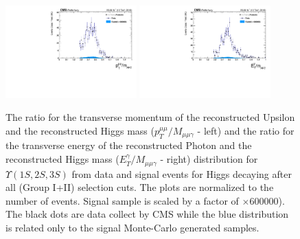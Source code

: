 \begin{figure}[!htbp]
\begin{center}
\includegraphics[width=0.45\textwidth]{figures_and_tables/outputPlots/HtoUpsilon_Cat0_ZZZZZ/nEvts/data_x_mc/withKinCuts/h_withKin_upsilonPt_over_zMass}\hspace*{1.cm}
\includegraphics[width=0.45\textwidth]{figures_and_tables/outputPlots/HtoUpsilon_Cat0_ZZZZZ/nEvts/data_x_mc/withKinCuts/h_withKin_photonPt_over_zMass}
\end{center}\vspace*{-.5cm}
\caption{The ratio for the transverse momentum of the reconstructed Upsilon and the reconstructed Higgs mass ($p_{T}^{\mu\mu}/M_{\mu\mu\gamma}$ - left) and the ratio for the transverse energy of the reconstructed Photon and the reconstructed Higgs mass ($E_{T}^{\gamma}/M_{\mu\mu\gamma}$ - right) distribution for $\Upsilon(1S,2S,3S)$ from data and signal events for Higgs decaying after all (Group I+II) selection cuts. The plots are normalized to the number of events. Signal sample is scaled by a factor of $\times 600000$). The black dots are data collect by CMS while the blue distribution is related only to the signal Monte-Carlo generated samples.}
\label{fig:energy_ration_HtoUpsilon_Cat0_groupI_plus_II}
\end{figure}


